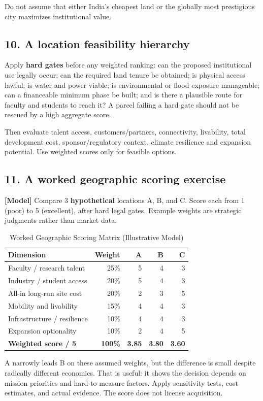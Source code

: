 Do not assume that either India's cheapest land or the globally most prestigious city maximizes institutional value.


\subsection{10. A location feasibility hierarchy}

Apply \textbf{hard gates} before any weighted ranking: can the proposed institutional use legally occur; can the required land tenure be obtained; is physical access lawful; is water and power viable; is environmental or flood exposure manageable; can a financeable minimum phase be built; and is there a plausible route for faculty and students to reach it? A parcel failing a hard gate should not be rescued by a high aggregate score.

Then evaluate talent access, customers/partners, connectivity, livability, total development cost, sponsor/regulatory context, climate resilience and expansion potential. Use weighted scores only for feasible options.


\subsection{11. A worked geographic scoring exercise}

\textbf{[Model]} Compare 3 \textbf{hypothetical} locations A, B, and C. Score each from 1 (poor) to 5 (excellent), after hard legal gates. Example weights are strategic judgments rather than market data.

\begin{table}[t]
\centering
\small
\caption{Worked Geographic Scoring Matrix (Illustrative Model)}
\label{tab:ch34_geo_scoring}
\begin{tabularx}{\columnwidth}{X r r r r}
\toprule
\textbf{Dimension} & \textbf{Weight} & \textbf{A} & \textbf{B} & \textbf{C} \\
\midrule
Faculty / research talent & 25\% & 5 & 4 & 3 \\
Industry / student access & 20\% & 5 & 4 & 3 \\
All-in long-run site cost & 20\% & 2 & 3 & 5 \\
Mobility and livability & 15\% & 4 & 4 & 3 \\
Infrastructure / resilience & 10\% & 4 & 4 & 3 \\
Expansion optionality & 10\% & 2 & 4 & 5 \\
\midrule
\textbf{Weighted score / 5} & \textbf{100\%} & \textbf{3.85} & \textbf{3.80} & \textbf{3.60} \\
\bottomrule
\end{tabularx}
\end{table}
A narrowly leads B on these assumed weights, but the difference is small despite radically different economics. That is useful: it shows the decision depends on mission priorities and hard-to-measure factors. Apply sensitivity tests, cost estimates, and actual evidence. The score does not license acquisition.


